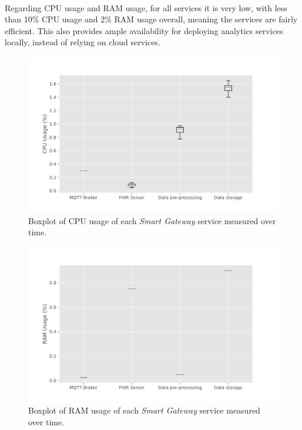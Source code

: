 \paragraph{} Regarding \acs{CPU} usage and \acs{RAM} usage, for all services it is very low, with less than 10\% \acs*{CPU} usage and 2\% \acs*{RAM} usage overall, meaning the services are fairly efficient. This also provides ample availability for deploying analytics services locally, instead of relying on cloud services.  

\begin{figure}[H]
    \centering
    \includegraphics[width=0.85\linewidth]{images/pilot_cpu_usage.pdf}
    \caption{Boxplot of \acs{CPU} usage of each \textit{Smart Gateway} service measured over time.}
    \label{fig:pilot-cpu-usage}
\end{figure}

\begin{figure}[H]
    \centering
    \includegraphics[width=0.85\linewidth]{images/pilot_ram_usage.pdf}
    \caption{Boxplot of \acs{RAM} usage of each \textit{Smart Gateway} service measured over time.}
    \label{fig:pilot-ram-usage}
\end{figure}


